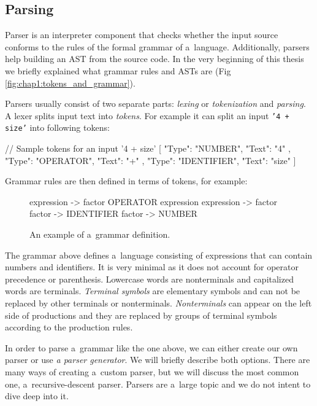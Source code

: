 \subsection{Parsing}
Parser is an interpreter component that checks whether the input source conforms to the rules of the formal grammar of a~language. Additionally, parsers help
building an AST from the source code. In the very beginning of this thesis we briefly explained what grammar rules and ASTs are
(Fig \ref{fig:chap1:tokens_and_grammar}).

Parsers usually consist of two separate parts: \emph{lexing} or \emph{tokenization} and \emph{parsing}. A lexer splits input text into \emph{tokens}.
For example it can split an input \texttt{'4 + size'} into following tokens:
\begin{code}
// Sample tokens for an input '4 + size'
[{ "Type": "NUMBER", "Text": "4" },
 { "Type": "OPERATOR", "Text": "+" },
 { "Type": "IDENTIFIER", "Text": "size" }]
\end{code}

Grammar rules are then defined in terms of tokens, for example:
\begin{figure}[!hbt]
    \begin{code}
    expression -> factor OPERATOR expression
    expression -> factor
    factor -> IDENTIFIER
    factor -> NUMBER
    \end{code}
    \caption{An example of a~grammar definition.}
    \label{fig:chap4:grammar}
\end{figure}

The grammar above defines a~language consisting of expressions that can contain numbers and identifiers. It is very minimal as it does not account
for operator precedence or parenthesis. Lowercase words are nonterminals and capitalized words are terminals. \emph{Terminal symbols} are elementary
symbols and can not be replaced by other terminals or nonterminals. \emph{Nonterminals} can appear on the left side of productions and they are replaced by groups
of terminal symbols according to the production rules.

In order to parse a~grammar like the one above, we can either create our own parser or use \emph{a parser generator}. We will briefly describe both options.
There are many ways of creating a~custom parser, but we will discuss the most common one, a~recursive-descent parser. Parsers are a~large topic and
we do not intent to dive deep into it.


